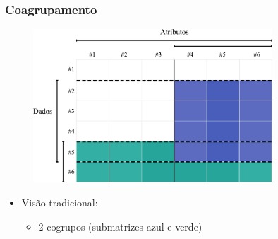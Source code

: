 \documentclass[10pt]{beamer}
\begin{document}
\begin{frame} [shrink=15]
  \frametitle{Coagrupamento}

  \begin{figure} [htpb]
    \includegraphics[width=0.8\textwidth]{img/bicluster.png}
  \end{figure}

  \begin{itemize}
    \item Visão tradicional:
    \begin{itemize}
      \item 2 cogrupos (submatrizes azul e verde)
    \end{itemize}
  \end{itemize}
\end{frame}



\end{document}
